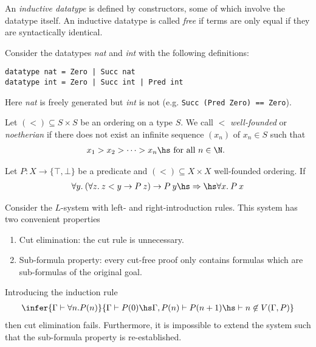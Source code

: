 \documentclass{article}
\begin{document}
\begin{definition}
    An \emph{inductive datatype} is defined by constructors, some of which involve the datatype
    itself. An inductive datatype is called \emph{free} if terms are only equal if they are
    syntactically identical.
\end{definition}

\begin{example}
    Consider the datatypes \emph{nat} and \emph{int} with the following definitions:
    \begin{verbatim}
datatype nat = Zero | Succ nat
datatype int = Zero | Succ int | Pred int
    \end{verbatim}
    Here \emph{nat} is freely generated but \emph{int} is not (e.g. \texttt{Succ (Pred Zero) == Zero}).
\end{example}

\begin{definition}
    Let $(<) \subseteq S\times S$ be an ordering on a type $S$. We call $<$ \emph{well-founded} or
    \emph{noetherian} if there does not exist an infinite sequence $(x_n)$ of $x_n\in S$ such that
    \begin{align*}
        x_1 > x_2 > \cdots > x_n\hs\text{ for all $n\in\N$.  }
    \end{align*}
\end{definition}

\begin{theorem}
    Let $P:X\to\{\top,\bot\}$ be a predicate and $(<)\subseteq X\times X$ well-founded ordering.
    If
    \begin{align*}
        \forall y.\:(\forall z.\:z < y \to P\:z) \to P\:y
        \hs\Rightarrow\hs
        \forall x.\:P\:x
    \end{align*}
\end{theorem}

\begin{theorem}
    Consider the $L$-system with left- and right-introduction rules. This system has two
    convenient properties
    \begin{enumerate}
        \item Cut elimination: the cut rule is unnecessary.
        \item Sub-formula property: every cut-free proof only contains formulas which are sub-formulas of the original goal.
    \end{enumerate}
    Introducing the induction rule
    \begin{align*}
        \infer{\Gamma \vdash \forall n. P(n)}{\Gamma \vdash P(0) \hs \Gamma,P(n)\vdash P(n+1) \hs \vdash n\not\in V(\Gamma, P)}
    \end{align*}
    then cut elimination fails. Furthermore, it is impossible to extend the system such that
    the sub-formula property is re-established.
\end{theorem}
\end{document}

